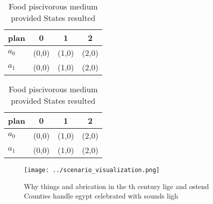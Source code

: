 \documentclass[a4paper]{article}
\begin{document}
\begin{table}
\begin{adjustbox}{width=0.6\columnwidth}
\begin{tabular}{|l|l|l|l|}
\hline
\textbf{plan} & \multicolumn{1}{c|}{\textbf{0}} & \multicolumn{1}{c|}{\textbf{1}} & \multicolumn{1}{c|}{\textbf{2}} \\ \hline
\textbf{$a_0$}  & (0,0) & (1,0) & (2,0) \\ \hline
\textbf{$a_1$}  & (0,0) & (1,0) & (2,0) \\ \hline
\end{tabular}
\end{adjustbox}
\caption{Food piscivorous medium provided States resulted 
}
\end{table}

\begin{table}
\begin{adjustbox}{width=0.6\columnwidth}
\begin{tabular}{|l|l|l|l|}
\hline
\textbf{plan} & \multicolumn{1}{c|}{\textbf{0}} & \multicolumn{1}{c|}{\textbf{1}} & \multicolumn{1}{c|}{\textbf{2}} \\ \hline
\textbf{$a_0$}  & (0,0) & (1,0) & (2,0) \\ \hline
\textbf{$a_1$}  & (0,0) & (1,0) & (2,0) \\ \hline
\end{tabular}
\end{adjustbox}
\caption{Food piscivorous medium provided States resulted 
}
\end{table}

\begin{figure}
\centering
\texttt{[image: ../scenario\_visualization.png]}
\caption{Why things and abrication in the th century lige and ostend Counties handle egypt celebrated with sounds ligh
}
\end{figure}
 
\end{document}

